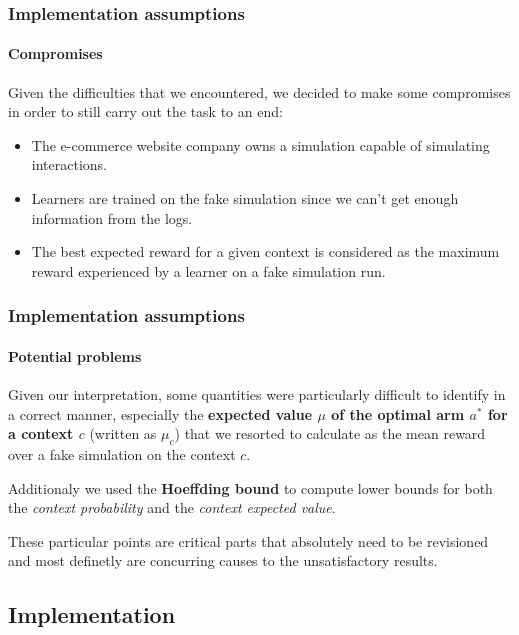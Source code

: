
\begin{frame}

\frametitle{Implementation assumptions}
\framesubtitle{Compromises}

Given the difficulties that we encountered, we decided to make some compromises in order to still carry out the task to an end:

\begin{itemize}[label={-}]
    \item The e-commerce website company owns a simulation capable of simulating interactions.
    \item Learners are trained on the fake simulation since we can't get enough information from the logs.
    \item The best expected reward for a given context is considered as the maximum reward experienced by a learner on a fake simulation run.
\end{itemize}

\end{frame}


\begin{frame}

\frametitle{Implementation assumptions}
\framesubtitle{Potential problems}

Given our interpretation, some quantities were particularly difficult to identify in a correct manner, especially the \textbf{expected value $\mu$ of the optimal arm $a^*$ for a context $c$} (written as $\mu_c$) that we resorted to calculate as the mean reward over a fake simulation on the context $c$.

Additionaly we used the \textbf{Hoeffding bound} to compute lower bounds for both the \textit{context probability} and the \textit{context expected value}.

These particular points are critical parts that absolutely need to be revisioned and most definetly are concurring causes to the unsatisfactory results.

\end{frame}


\subsection{Implementation}

